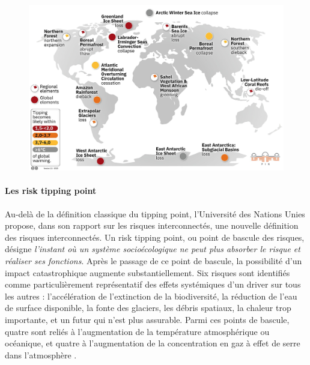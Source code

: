\begin{figure}
    \centering
    \includegraphics[width=1\linewidth]{figures/Tipping_points_2022_list.jpeg}
    \label{fig:tipping-points-earth}
\end{figure}

\paragraph{Les \gls{risk tipping point}}

Au-delà de la définition classique du tipping point, l'Université des Nations Unies propose, dans son rapport sur les risques interconnectés, une nouvelle définition des risques interconnectés. Un \gls{risk tipping point}, ou point de bascule des risques, désigne \textit{l'instant où un système socioécologique ne peut plus absorber le risque et réaliser ses fonctions}. Après le passage de ce point de bascule, la possibilité d'un impact catastrophique augmente substantiellement. Six risques sont identifiés comme particulièrement représentatif des effets systémiques d'un driver sur tous les autres : l'accélération de l'extinction de la biodiversité, la réduction de l'eau de surface disponible, la fonte des glaciers, les débris spatiaux, la chaleur trop importante, et un futur qui n'est plus assurable. Parmi ces points de bascule, quatre sont  reliés à l'augmentation de la température atmosphérique ou océanique, et quatre à l'augmentation de la concentration en gaz à effet de serre dans l'atmosphère \autocite{united_nations_university_-_institute_for_environment_and_human_security_unu-ehs_interconnected_2023}. \\

